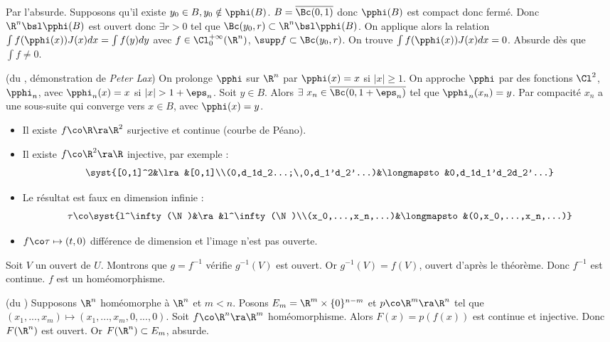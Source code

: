 \prvv
Par l'absurde. Supposons qu'il existe $y_0\in B, y_0\notin\pphi(B)$. $B=\overline{\Bc(0,1)}$ donc $\pphi(B)$ est compact donc fermé. Donc $\R^n\bsl\pphi(B)$ est ouvert donc $\exists r>0$ tel que $\Bc(y_0,r)\subset\R^n\bsl\pphi(B)$.
\dl On applique alors la relation $\int f(\pphi(x))J(x)dx=\int f(y)dy$ avec $f\in \Cl_0^{+\infty}(\R^n)$, $\supp f\subset\Bc(y_0,r)$. On trouve $\int f(\pphi(x))J(x)dx=0$. Absurde dès que $\int f\neq 0$.
\prvf


\prv (du , démonstration de \emph{Peter Lax})
\dl On prolonge $\pphi$ sur $\R^n$ par $\pphi(x)=x$ si $|x|\ge1$. On approche $\pphi$ par des fonctions $\Cl^2$, $\pphi_n$, avec $\pphi_n(x)=x$ si $|x|>1+\eps_n$. Soit $y\in B$. Alors $\exists\ x_n\in\overline{\Bc(0,1+\eps_n)}$ tel que $\pphi_n(x_n)=y$. Par compacité $x_n$ a une sous-suite qui converge vers $x\in B$, avec $\pphi(x)=y$.
\prvf



\rmk 
\begin{itemize} 
  \item Il existe $f\co\R\ra\R^2$ surjective et continue (courbe de Péano).
  \item Il existe $f\co\R^2\ra\R$ injective, par exemple :
    $$\syst{[0,1]^2&\lra&[0,1]\\(0,d_1d_2...;\ 0,d_1'd_2'...)&\longmapsto &0,d_1d_1'd_2d_2'...}$$
  \item Le résultat est faux en dimension infinie :
    $$\tau\co\syst{l^\infty(\N)&\ra&l^\infty(\N)\\(x_0,...,x_n,...)&\longmapsto&(0,x_0,...,x_n,...)}$$
  \item $f\co\tau\mapsto(t,0)$ différence de dimension et l'image n'est pas ouverte.
\end{itemize}


\prvv
Soit $V$ un ouvert de $U$. Montrons que $g=f^{-1}$ vérifie $g^{-1}(V)$ est ouvert. Or $g^{-1}(V)=f(V)$, ouvert d'après le théorème. Donc $f^{-1}$ est continue. $f$ est un homéomorphisme.
\prvf

\prv (du )
\dl Supposons $\R^n$ homéomorphe à $\R^n$ et $m<n$. Posons $E_m=\R^m\times\{0\}^{n-m}$ et $p\co\R^m\ra\R^n$ tel que $(x_1,...,x_m)\mapsto(x_1,...,x_m,0,...,0)$. Soit $f\co\R^n\ra\R^m$ homéomorphisme. Alors $F(x)=p(f(x))$ est continue et injective. Donc $F(\R^n)$ est ouvert. Or $F(\R^n)\subset E_m$, absurde.
\prvf

